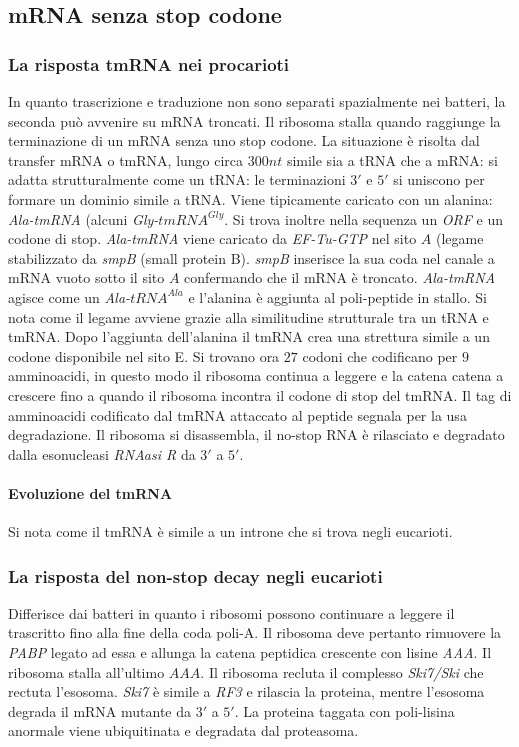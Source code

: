 \subsection{mRNA senza stop codone}
\subsubsection{La risposta tmRNA nei procarioti}
In quanto trascrizione e traduzione non sono separati spazialmente nei batteri, la seconda pu\`o avvenire su mRNA troncati. Il ribosoma stalla quando raggiunge la terminazione di un 
mRNA senza uno stop codone. La situazione \`e risolta dal transfer mRNA o tmRNA, lungo circa $300nt$ simile sia a tRNA che a mRNA: si adatta strutturalmente come un tRNA: le terminazioni
$3'$ e $5'$ si uniscono per formare un dominio simile a tRNA. Viene tipicamente caricato con un alanina: \emph{Ala-tmRNA} (alcuni \emph{Gly-$tmRNA^{Gly}$}. Si trova inoltre nella
sequenza un \emph{ORF} e un codone di stop. \emph{Ala-tmRNA} viene caricato da \emph{EF-Tu-GTP} nel sito $A$ (legame stabilizzato da \emph{smpB} (small protein B). \emph{smpB} 
inserisce la sua coda nel canale a mRNA vuoto sotto il sito $A$ confermando che il mRNA \`e troncato. \emph{Ala-tmRNA} agisce come un \emph{Ala-$tRNA^{Ala}$} e l'alanina \`e aggiunta
al poli-peptide in stallo. Si nota come il legame avviene grazie alla similitudine strutturale tra un tRNA e tmRNA. Dopo l'aggiunta dell'alanina il tmRNA crea una strettura simile
a un codone disponibile nel sito E. Si trovano ora $27$ codoni che codificano per $9$ amminoacidi, in questo modo il ribosoma continua a leggere e la catena catena a crescere fino
a quando il ribosoma incontra il codone di stop del tmRNA. Il tag di amminoacidi codificato dal tmRNA attaccato al peptide segnala per la usa degradazione. Il ribosoma si disassembla, 
il no-stop RNA \`e rilasciato e degradato dalla esonucleasi \emph{RNAasi R} da $3'$ a $5'$. 
\paragraph{Evoluzione del tmRNA} 
Si nota come il tmRNA \`e simile a un introne che si trova negli eucarioti. 
\subsubsection{La risposta del non-stop decay negli eucarioti}
Differisce dai batteri in quanto i ribosomi possono continuare a leggere il trascritto fino alla fine della coda poli-A. Il ribosoma deve pertanto rimuovere la \emph{PABP} legato ad
essa e allunga la catena peptidica crescente con lisine \emph{AAA}. Il ribosoma stalla all'ultimo $AAA$. Il ribosoma recluta il complesso \emph{Ski7/Ski} che rectuta l'esosoma. 
\emph{Ski7} \`e simile a \emph{RF3} e rilascia la proteina, mentre l'esosoma degrada il mRNA mutante da $3'$ a $5'$. La proteina taggata con poli-lisina anormale viene ubiquitinata
e degradata dal proteasoma. 

